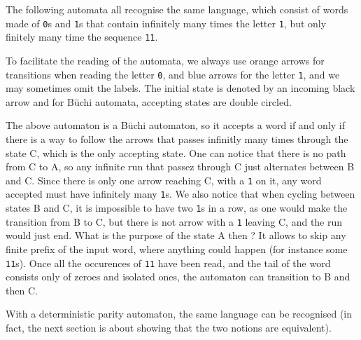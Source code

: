 \begin{examples}
    The following automata all recognise the same language,
    which consist of words made of \texttt{0}s and \texttt{1}s
    that contain infinitely many times
    the letter \texttt{1}, but only finitely many time the sequence \texttt{11}.

    To facilitate the reading of the automata, we always use orange arrows for
    transitions when reading the letter \verb|0|, and blue arrows for the letter \verb|1|,
    and we may sometimes omit the labels. The initial state is denoted by
    an incoming black arrow and for Büchi automata, accepting states are double circled.

    \begin{center}
        
    \end{center}

    The above automaton is a Büchi automaton, so it accepts a word if and only if
    there is a way to follow the arrows that passes infinitly many times through the state C,
    which is the only accepting state. One can notice that there is no path from C to A,
    so any infinite run that passez through C just alternates between B and C.
    Since there is only one arrow reaching C, with a \texttt{1} on it,
    any word accepted must have infinitely many \texttt{1}s. We also notice
    that when cycling between states B and C, it is impossible to have two \texttt{1}s
    in a row, as one would make the transition from B to C, but there is not arrow
    with a \texttt{1} leaving C, and the run would just end. What is the purpose of the
    state A then ? It allows to skip any finite prefix of the input word, where anything could happen
    (for instance some \texttt{11}s).
    Once all the occurences of \texttt{11} have been read, and the tail of the word consists
    only of zeroes and isolated ones, the automaton can transition to B and then C.

    With a deterministic parity automaton, the same language can be recognised
    (in fact, the next section is about showing that the two notions are equivalent).

    \begin{center}
    \end{center}


\end{examples}
